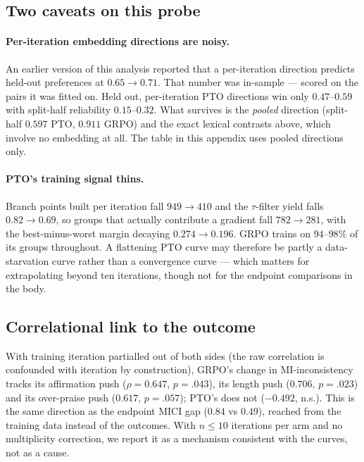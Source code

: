 \subsection{Two caveats on this probe}
\paragraph{Per-iteration embedding directions are noisy.} An earlier version of this analysis
reported that a per-iteration direction predicts held-out preferences at $0.65\rightarrow0.71$.
That number was in-sample --- scored on the pairs it was fitted on. Held out, per-iteration PTO
directions win only $0.47$--$0.59$ with split-half reliability $0.15$--$0.32$. What survives is
the \emph{pooled} direction (split-half $0.597$ PTO, $0.911$ GRPO) and the exact lexical contrasts
above, which involve no embedding at all. The table in this appendix uses pooled directions
only.

\paragraph{PTO's training signal thins.} Branch points built per iteration fall $949\rightarrow410$
and the $\tau$-filter yield falls $0.82\rightarrow0.69$, so groups that actually contribute a
gradient fall $782\rightarrow281$, with the best-minus-worst margin decaying
$0.274\rightarrow0.196$. GRPO trains on $94$--$98\%$ of its groups throughout. A flattening PTO
curve may therefore be partly a data-starvation curve rather than a convergence curve --- which
matters for extrapolating beyond ten iterations, though not for the endpoint comparisons in the
body.

\subsection{Correlational link to the outcome}
With training iteration partialled out of both sides (the raw correlation is confounded with
iteration by construction), GRPO's change in MI-inconsistency tracks its affirmation push
($\rho=0.647$, $p=.043$), its length push ($0.706$, $p=.023$) and its over-praise push ($0.617$,
$p=.057$); PTO's does not ($-0.492$, n.s.). This is the same direction as the endpoint MICI gap
($0.84$ vs $0.49$), reached from the training data instead of the outcomes. With $n\leq10$
iterations per arm and no multiplicity correction, we report it as a mechanism consistent with the
curves, not as a cause.

